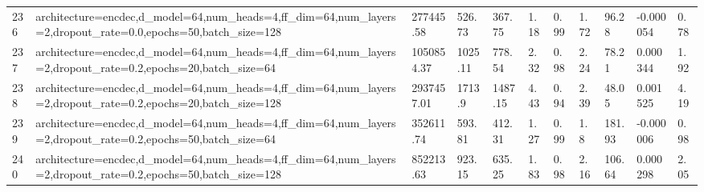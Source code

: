 \begin{longtable}{C{0.8cm} L{2cm} C{1.15cm} C{1.15cm} C{1.15cm} C{1.15cm} C{0.85cm} C{1.25cm} C{1.2cm} C{1.5cm} C{1.0cm}}
236 & architecture=encdec,\newline d\_model=64,\newline num\_heads=4,\newline ff\_dim=64,\newline num\_layers=2,\newline dropout\_rate=0.0,\newline epochs=50,\newline batch\_size=128 & 277445.58 & 526.73 & 367.75 & 1.18 & 0.99 & 1.72 & 96.28 & -0.000054 & 0.78 \\
237 & architecture=encdec,\newline d\_model=64,\newline num\_heads=4,\newline ff\_dim=64,\newline num\_layers=2,\newline dropout\_rate=0.2,\newline epochs=20,\newline batch\_size=64 & 1050854.37 & 1025.11 & 778.54 & 2.32 & 0.98 & 2.24 & 78.21 & 0.000344 & 1.92 \\
238 & architecture=encdec,\newline d\_model=64,\newline num\_heads=4,\newline ff\_dim=64,\newline num\_layers=2,\newline dropout\_rate=0.2,\newline epochs=20,\newline batch\_size=128 & 2937457.01 & 1713.9 & 1487.15 & 4.43 & 0.94 & 2.39 & 48.05 & 0.001525 & 4.19 \\
239 & architecture=encdec,\newline d\_model=64,\newline num\_heads=4,\newline ff\_dim=64,\newline num\_layers=2,\newline dropout\_rate=0.2,\newline epochs=50,\newline batch\_size=64 & 352611.74 & 593.81 & 412.31 & 1.27 & 0.99 & 1.8 & 181.93 & -0.000006 & 0.98 \\
240 & architecture=encdec,\newline d\_model=64,\newline num\_heads=4,\newline ff\_dim=64,\newline num\_layers=2,\newline dropout\_rate=0.2,\newline epochs=50,\newline batch\_size=128 & 852213.63 & 923.15 & 635.25 & 1.83 & 0.98 & 2.16 & 106.64 & 0.000298 & 2.05 \\

\end{longtable}
